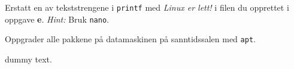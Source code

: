 \begin{subprob}
    Erstatt en av tekststrengene i \verb|printf| med \textit{Linux er lett!} i filen du opprettet i oppgave \textbf{e}. \textit{Hint:} Bruk \verb|nano|.
\end{subprob}

\begin{subprob}
    Oppgrader alle pakkene på datamaskinen på sanntidssalen med \verb|apt|.
	\begin{solution}
	    dummy text. 
	\end{solution}
\end{subprob}


